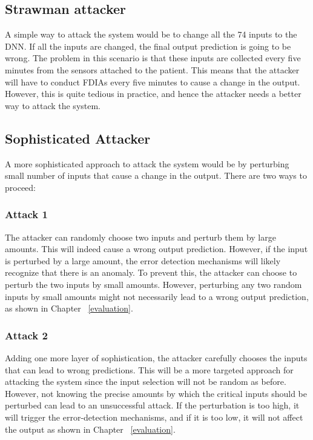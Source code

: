 \subsection{Strawman attacker}
A simple way to attack the system would be to change all the 74 inputs to the DNN.
 If all the inputs are changed, the final output prediction is going to be wrong. The problem in this  scenario is that 
 these inputs are collected every five minutes from the sensors attached to the patient. 
 This means that the attacker will have to conduct FDIAs every five minutes to cause a change in the output. 
 However, this is quite tedious in practice, and hence the attacker needs a better way to attack the system. 

\subsection{Sophisticated Attacker}
A more sophisticated approach to attack the system would be by perturbing small number of inputs that cause a change in the output. 
There are two ways to proceed:

\subsubsection{Attack 1}
The attacker can randomly choose two inputs and perturb them by large amounts. 
This will indeed cause a wrong output prediction. 
However, if the input is perturbed by a large amount, the error detection mechanisms will likely recognize that there is an anomaly. 
To prevent this, the attacker can choose to perturb the two inputs by small amounts. 
However, perturbing any two random inputs by small amounts might not necessarily lead to a wrong output prediction, as shown in Chapter ~\ref{evaluation}. 

\subsubsection{Attack 2}
Adding one more layer of sophistication, the attacker carefully chooses the inputs that can lead to wrong predictions. 
 This will be a more targeted approach for attacking the system since the input selection will not be random as before. 
However, not knowing the precise amounts by which the critical inputs should be perturbed can lead to an unsuccessful attack. 
If the perturbation is too high, it will trigger the error-detection mechanisms, 
and if it is too low, it will not affect the output as shown in Chapter ~\ref{evaluation}. 

